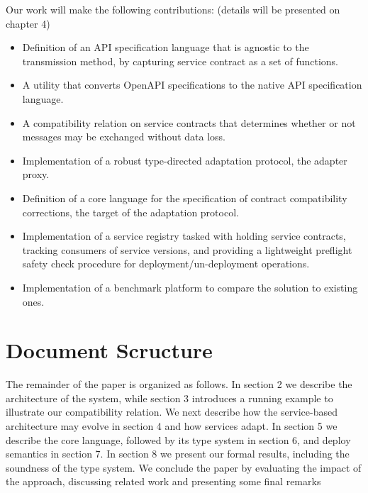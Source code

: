 Our work will make the following contributions: (details will be presented on chapter 4)

\begin{itemize}
    \item Definition of an API specification language that is agnostic to the transmission method, by capturing service contract as a set of functions.
    \item A utility that converts OpenAPI specifications to the native API specification language.
    \item A compatibility relation on service contracts that determines whether or not messages may be exchanged without data loss.
    \item Implementation of a robust type-directed adaptation protocol, the adapter proxy.
    \item Definition of a core language for the specification of contract compatibility corrections, the target of the adaptation protocol.
    \item Implementation of a service registry tasked with holding service contracts, tracking consumers of service versions,
    and providing a lightweight preflight safety check procedure for deployment/un-deployment operations.
    \item Implementation of a benchmark platform to compare the solution to existing ones.
\end{itemize}

\section{Document Scructure} %
\label{sec:document_structure}

The remainder of the paper is organized as follows. In section 2 we describe the
architecture of the system, while section 3 introduces a running example to illustrate
our compatibility relation. We next describe how the service-based architecture may
evolve in section 4 and how services adapt. In section 5 we describe the core language,
followed by its type system in section 6, and deploy semantics in section 7. In section 8
we present our formal results, including the soundness of the type system. We conclude
the paper by evaluating the impact of the approach, discussing related work and
presenting some final remarks